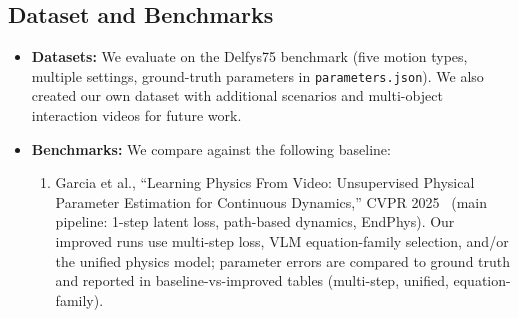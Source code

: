 \subsection{Dataset and Benchmarks}
\begin{itemize}[leftmargin=1.5em]
    \item \textbf{Datasets:} We evaluate on the Delfys75 benchmark (five motion types, multiple settings, ground-truth parameters in \texttt{parameters.json}). We also created our own dataset with additional scenarios and multi-object interaction videos for future work.
    \item \textbf{Benchmarks:} We compare against the following baseline:
    \begin{enumerate}
        \item Garcia et al., ``Learning Physics From Video: Unsupervised Physical Parameter Estimation for Continuous Dynamics,'' CVPR 2025~\cite{garcia2025learning} (main pipeline: 1-step latent loss, path-based dynamics, EndPhys). Our improved runs use multi-step loss, VLM equation-family selection, and/or the unified physics model; parameter errors are compared to ground truth and reported in baseline-vs-improved tables (multi-step, unified, equation-family).
    \end{enumerate}
\end{itemize}
